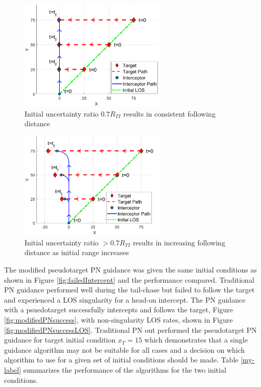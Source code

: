 \documentclass[conference]{IEEEtran}
\begin{document}
\begin{figure}[H]
	\centering
	\includegraphics[width=7cm]{Rinit07new.png}
	\caption{Initial uncertainty ratio $0.7R_{TI}$ results in consistent following distance}
	\label{fig:rti07}
\end{figure}

\begin{figure}[H]
	\centering
	\includegraphics[width=7cm]{rinit08new.png}
	\caption{Initial uncertainty ratio $>0.7R_{TI}$ results in increasing following distance as initial range increases}
	\label{fig:rti08}
\end{figure}




The modified pseudotarget PN guidance was given the same initial conditions as shown in Figure \ref{fig:failedIntercept} and the performance compared. Traditional PN guidance performed well during the tail-chase but failed to follow the target and experienced a LOS singularity for a head-on intercept. The PN guidance with a psuedotarget successfully intercepts and follows the target, Figure \ref{fig:modifiedPNsuccess}, with non-singularity LOS rates, shown in Figure \ref{fig:modifiedPNsuccessLOS}. Traditional PN out performed the pseudotarget PN guidance for target initial condition $x_{T} = 15$ which demonstrates that a single guidance algorithm may not be suitable for all cases and a decision on which algorithm to use for a given set of initial conditions should be made. Table \ref{my-label} summarizes the performance of the algorithms for the two initial conditions.
\end{document}
